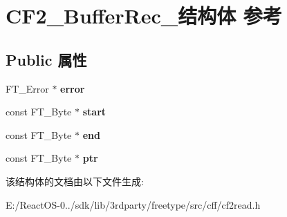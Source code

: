 \hypertarget{struct_c_f2___buffer_rec__}{}\section{C\+F2\+\_\+\+Buffer\+Rec\+\_\+结构体 参考}
\label{struct_c_f2___buffer_rec__}
\subsection*{Public 属性}
\begin{DoxyCompactItemize}
\item 
\mbox{\label{struct_c_f2___buffer_rec___adde69d425262f574b3b2699fd6d7ba26}} 
F\+T\+\_\+\+Error $\ast$ {\bfseries error}
\item 
\mbox{\label{struct_c_f2___buffer_rec___a6c38754950bb514b596574dc4a089ede}} 
const F\+T\+\_\+\+Byte $\ast$ {\bfseries start}
\item 
\mbox{\label{struct_c_f2___buffer_rec___a927ccbd21c3e95b5858ea599bc9b2f47}} 
const F\+T\+\_\+\+Byte $\ast$ {\bfseries end}
\item 
\mbox{\label{struct_c_f2___buffer_rec___a0928b29d34f647699864d1c82e06e86b}} 
const F\+T\+\_\+\+Byte $\ast$ {\bfseries ptr}
\end{DoxyCompactItemize}


该结构体的文档由以下文件生成\+:\begin{DoxyCompactItemize}
\item 
E\+:/\+React\+O\+S-\/0../sdk/lib/3rdparty/freetype/src/cff/cf2read.\+h\end{DoxyCompactItemize}

